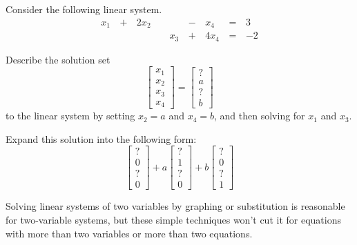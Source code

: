 \begin{applicationActivities}{1}{3}
\begin{activity}{10}
  Consider the following linear system.
  \begin{alignat*}{5}
    x_1 &\,+\,& 2x_2 &\, \,&     &\,-\,&  x_4 &\,=\,& 3 \\
        &\, \,&      &\, \,& x_3 &\,+\,& 4x_4 &\,=\,& -2
  \end{alignat*}
  \begin{subactivity}
  Describe the solution set
  \[
    \begin{bmatrix}
      x_1 \\
      x_2 \\
      x_3 \\
      x_4
    \end{bmatrix}=
    \begin{bmatrix}
      ? \\
      a \\
      ? \\
      b
    \end{bmatrix}
  \]to the linear system
  by setting \(x_2=a\) and \(x_4=b\), and then solving for \(x_1\) and
  \(x_3\).
  \end{subactivity}
  \begin{subactivity}
    Expand this solution into the following form:
    \[
      \begin{bmatrix}
        ? \\
        0 \\
        ? \\
        0
      \end{bmatrix}+
      a\begin{bmatrix}
        ? \\
        1 \\
        ? \\
        0
      \end{bmatrix}+
      b\begin{bmatrix}
        ? \\
        0 \\
        ? \\
        1
      \end{bmatrix}
    \]
  \end{subactivity}
\end{activity}

\begin{observation}
  Solving linear systems of two variables by graphing or substitution is
  reasonable for two-variable systems, but these simple techniques
  won't cut it for equations with
  more than two variables or more than two equations.
\end{observation}


\end{applicationActivities}
